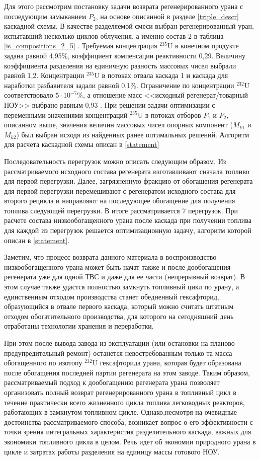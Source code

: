 Для этого рассмотрим постановку задачи возврата регенерированного урана с последующим замыканием $P_2$, на основе описанной в разделе \ref{triple_descr} каскадной схемы. В качестве разделяемой смеси выбран регенерированный уран, испытавший несколько циклов облучения, а именно состав 2 в таблица \ref{is_compositions_2_5} \cite{smirnovObogashchenieRegenerirovannogoUrana2018}. Требуемая концентрация $^{235}$U в конечном продукте задана равной 4,95\%, коэффициент компенсации реактивности 0,29. Величину коэффициента разделения на единичную разность массовых чисел выбрали равной 1,2. Концентрации $^{235}$U в потоках отвала каскада 1 и каскада для наработки разбавителя задали равной 0,1\%. Ограничение по концентрации $^{232}$U соответствовало $5\cdot10^{-7} \%$, а отношение масс <<исходный регенерат/товарный НОУ>> выбрано равным 0,93 \cite{smirnovObogashchenieRegenerirovannogoUrana2018}.  При решении задачи оптимизации с переменными значениями концентраций $^{235}$U в потоках отборов $P_1$ и $P_2$, описанном выше, значения величин массовых чисел опорных компонент ($M_{k1}$ и $M_{k2}$) был выбран исходя из найденных ранее оптимальных решений. Алгоритм для расчета каскадной схемы описан в \ref{statement}

Последовательность перегрузок можно описать следующим образом. Из рассматриваемого исходного состава регенерата изготавливают сначала топливо для первой перегрузки. Далее, загрязненную фракцию от обогащения регенерата для первой перегрузки перемешивают с регенератом исходного состава для второго рецикла и направляют на последующее обогащение для получения топлива следующей перегрузки. В итоге рассматривается 7 перегрузок. При расчете состава низкообогащенного урана после каскада при получении топлива для каждой из перегрузок решается оптимизационную задачу, алгоритм которой описан в \ref{statement}.

Заметим, что процесс возврата данного материала в воспроизводство низкообогащенного урана может быть начат также и после дообогащения регенерата уже для одной ТВС и даже для ее части (непрерывный возврат). В этом случае также удастся полностью замкнуть топливный цикл по урану, а единственным отходом производства станет обедненный гексафторид, образующийся в отвале первого каскада, который можно считать штатным отходом обогатительного производства, для которого на сегодняшний день отработаны технологии хранения и переработки.

При этом после вывода завода из эксплуатации (или остановки на планово-предупредительный ремонт) останется невостребованным только та масса обогащенного по изотопу $^{232}$U гексафторида урана, которая будет образована после обогащения последней партии регенерата на этом заводе. Таким образом, рассматриваемый подход к дообогащению регенерата урана позволяет организовать полный возврат регенерированного урана в топливный цикл в течение практически всего жизненного цикла топлива легководных реакторов, работающих в замкнутом топливном цикле. Однако,несмотря на очевидные достоинства рассматриваемого способа, возникает вопрос о его эффективности с точки зрения интегральных характеристик разделительного каскада, важных для экономики топливного цикла в целом. Речь идет об экономии природного урана в цикле и затратах работы разделения на единицу массы готового НОУ.


